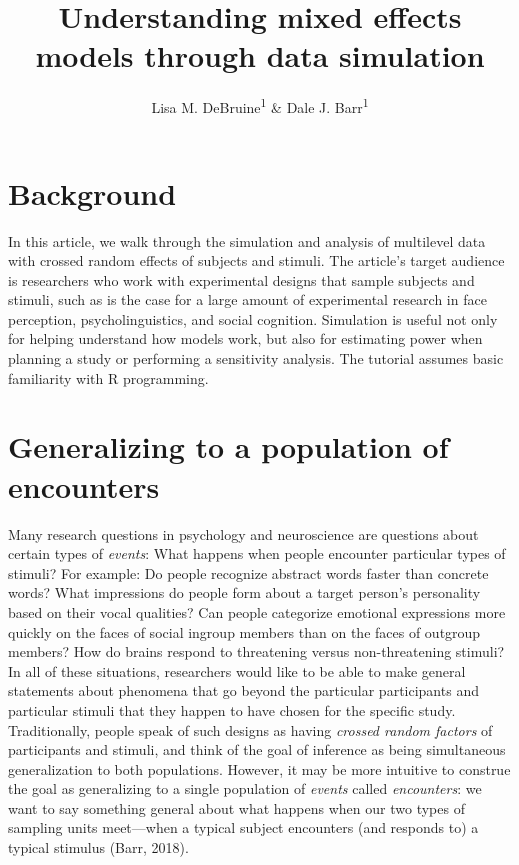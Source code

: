 \documentclass[
  english,
  doc,floatsintext]{apa6}
\title{Understanding mixed effects models through data simulation}
\author{Lisa M. DeBruine\textsuperscript{1} \& Dale J. Barr\textsuperscript{1}}
\date{}
\affiliation{\vspace{0.5cm}\textsuperscript{1} Institute of Neuroscience and Psychology, University of Glasgow}
\begin{document}
\maketitle

\hypertarget{background}{%
\section{Background}\label{background}}

In this article, we walk through the simulation and analysis of multilevel data with crossed random effects of subjects and stimuli. The article's target audience is researchers who work with experimental designs that sample subjects and stimuli, such as is the case for a large amount of experimental research in face perception, psycholinguistics, and social cognition. Simulation is useful not only for helping understand how models work, but also for estimating power when planning a study or performing a sensitivity analysis. The tutorial assumes basic familiarity with R programming.

\hypertarget{generalizing-to-a-population-of-encounters}{%
\section{Generalizing to a population of encounters}\label{generalizing-to-a-population-of-encounters}}

Many research questions in psychology and neuroscience are questions about certain types of \emph{events}: What happens when people encounter particular types of stimuli? For example: Do people recognize abstract words faster than concrete words? What impressions do people form about a target person's personality based on their vocal qualities? Can people categorize emotional expressions more quickly on the faces of social ingroup members than on the faces of outgroup members? How do brains respond to threatening versus non-threatening stimuli? In all of these situations, researchers would like to be able to make general statements about phenomena that go beyond the particular participants and particular stimuli that they happen to have chosen for the specific study. Traditionally, people speak of such designs as having \emph{crossed random factors} of participants and stimuli, and think of the goal of inference as being simultaneous generalization to both populations. However, it may be more intuitive to construe the goal as generalizing to a single population of \emph{events} called \emph{encounters}: we want to say something general about what happens when our two types of sampling units meet---when a typical subject encounters (and responds to) a typical stimulus (Barr, 2018).
\end{document}
